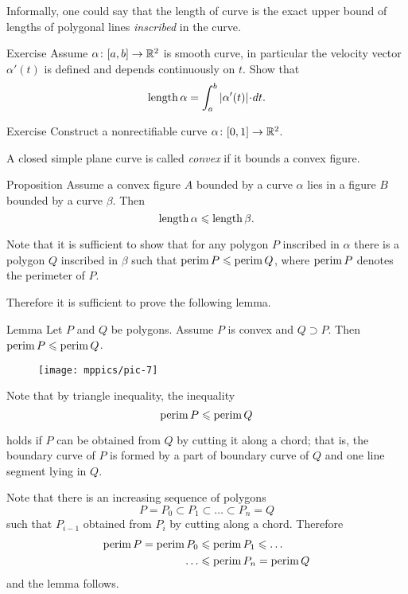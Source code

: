 Informally, one could say that the length of curve is the exact upper bound of lengths of polygonal lines \emph{inscribed} in the curve.

\begin{thm}{Exercise}
Assume $\alpha\colon[a,b]\to\mathbb{R}^2$ is smooth curve, in particular the velocity vector $\alpha'(t)$ is defined and depends continuously on $t$.
Show that
\[\length \alpha=\int_a^b|\alpha'(t)|\cdot dt.\]
\end{thm}

\begin{thm}{Exercise}\label{ex:nonrectifiable-curve}
Construct a nonrectifiable curve $\alpha\colon[0,1]\to\mathbb{R}^2$.
\end{thm}

A closed simple plane curve is called \emph{convex} if it bounds a convex figure.

\begin{thm}{Proposition}\label{prop:convex-curve}
Assume a convex figure $A$ bounded by a curve $\alpha$ lies in a figure $B$ bounded by a curve $\beta$.
Then
\[\mathop{\rm length}\nolimits\alpha\leqslant \mathop{\rm length}\nolimits\beta.\]
\end{thm}

Note that it is sufficient to show that for any polygon  $P$ inscribed in $\alpha$ there is a polygon $Q$ inscribed in $\beta$ such that 
$\mathop{\rm perim}\nolimits P\leqslant \mathop{\rm perim}\nolimits Q$, where $\mathop{\rm perim}\nolimits P$ denotes the perimeter of $P$.

Therefore it is sufficient to prove the following lemma.


\begin{thm}{Lemma}\label{lem:perimeter}
Let $P$ and $Q$ be polygons.
Assume $P$ is convex and $Q\supset P$.
Then $\mathop{\rm perim}\nolimits P\leqslant \mathop{\rm perim}\nolimits Q$.
\end{thm}


\begin{wrapfigure}{r}{24 mm}
\vskip-4mm
\centering
\texttt{[image: mppics/pic-7]}
\end{wrapfigure}

Note that by triangle inequality,
the inequality
\[\mathop{\rm perim}\nolimits P\leqslant \mathop{\rm perim}\nolimits Q\]

holds
if $P$ can be obtained from $Q$ by cutting it along a chord;
that is, the boundary curve of $P$ is formed by a part of boundary curve of $Q$ and one line segment lying in $Q$.


Note that there is an increasing sequence of polygons 
$$P=P_0\subset P_1\subset\dots\subset P_n=Q$$
such that $P_{i-1}$ obtained from $P_{i}$ by cutting along a chord.
Therefore 
\begin{align*}
\mathop{\rm perim}\nolimits P=\mathop{\rm perim}\nolimits P_0&\leqslant\mathop{\rm perim}\nolimits P_1\leqslant\dots
\\
\dots&\leqslant\mathop{\rm perim}\nolimits P_n=\mathop{\rm perim}\nolimits Q
\end{align*}
and the lemma follows.
\qeds

